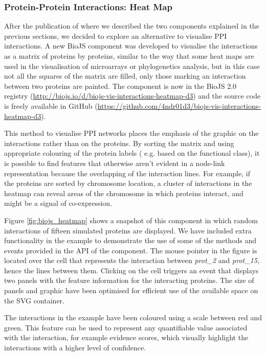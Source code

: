 \subsubsection{Protein-Protein Interactions: Heat Map} \label{subsubsec:ppi3_biojs}
After the publication of \cite{SAL2014} where we described the two components explained in the previous sections, we decided to explore an alternative to visualise PPI interactions. A new BioJS component was developed to visualise the interactions as a matrix of proteins by proteins, similar to the way that some heat maps are used in the visualisation of microarrays or phylogenetics analysis, but in this case not all the squares of the matrix are filled, only those marking an interaction between two proteins are painted. The component is now in the BioJS 2.0 registry (\url{http://biojs.io/d/biojs-vis-interactions-heatmap-d3}) and the source code is freely available in GitHub (\url{https://github.com/4ndr01d3/biojs-vis-interactions-heatmap-d3}).

This method to visualise PPI networks places the emphasis of the graphic on the interactions rather than on the proteins. By sorting the matrix and using appropriate colouring of the protein labels ( e.g. based on the functional class), it is possible to find features that otherwise aren't evident in a node-link representation because the overlapping of the interaction lines. For example, if the proteins are sorted by chromosome location, a cluster of interactions in the heatmap can reveal areas of the chromosome in which proteins interact, and might be a signal of co-expression.

Figure \ref{fig:biojs_heatmap} shows a snapshot of this component in which random interactions of fifteen simulated proteins are displayed. We have included extra functionality in the example to demonstrate the use of some of the methods and events provided in the API of the component. The mouse pointer in the figure is located over the cell that represents the interaction between \emph{prot\_2} and \emph{prot\_15}, hence the lines between them. Clicking on the cell triggers an event that displays two panels with the feature information for the interacting proteins. The size of panels and graphic have been optimised for efficient use of the available space on the SVG container.

The interactions in the example have been coloured using a scale between red and green. This feature can be used to represent any quantifiable value associated with the interaction, for example evidence scores, which visually highlight the interactions with a higher level of confidence.

